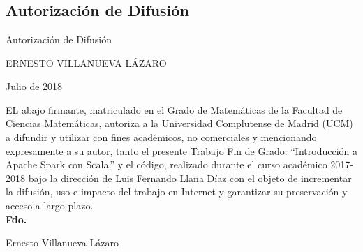 \chapter*{}

\section*{Autorización de Difusión}

\begin{center}
Autorización de Difusión\\
\end{center}

ERNESTO VILLANUEVA LÁZARO\\

\begin{center}
Julio de 2018
\end{center}
EL abajo firmante, matriculado en el Grado de Matemáticas de la Facultad de
Ciencias Matemáticas, autoriza a la Universidad Complutense de Madrid (UCM) a difundir y
utilizar con fines académicos, no comerciales y mencionando expresamente a su autor, tanto  el presente Trabajo Fin de Grado: “Introducción a Apache Spark con Scala.” y el código, realizado durante el curso académico 2017-2018 bajo la dirección de Luis Fernando Llana Díaz con el objeto de incrementar la difusión, uso e impacto del trabajo en Internet y garantizar su preservación y acceso a largo plazo.\\


\textbf{Fdo.}

\begin{center}
Ernesto Villanueva Lázaro

\end{center}